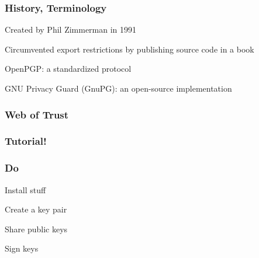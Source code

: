 \documentclass{beamer}
\begin{document}
\begin{frame}
  \frametitle{History, Terminology}

Created by Phil Zimmerman in 1991

Circumvented export restrictions by publishing source code in a book

OpenPGP: a standardized protocol

GNU Privacy Guard (GnuPG): an open-source implementation

\end{frame}

\begin{frame}
  \frametitle{Web of Trust}
\end{frame}

\begin{frame}
  \frametitle{Tutorial!}
\end{frame}

\begin{frame}
  \frametitle{Do}

  Install stuff

  Create a key pair

  Share public keys

  Sign keys

\end{frame}
\end{document}
